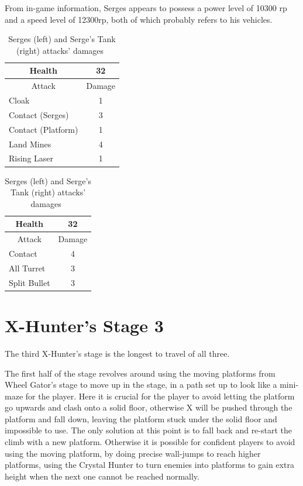 From in-game information, Serges appears to possess a power level of 10300 rp and a speed level of 12300rp, both of which probably refers to his vehicles.

\begin{table}[htp]
	\centering
	\begin{minipage}{.45\linewidth}
		\centering
		\begin{tabular}[h]{l c }
			\toprule
			\multicolumn{1}{c}{Health}  & 32 \\
			\midrule
			\multicolumn{1}{c}{Attack} & \multicolumn{1}{c}{Damage}\\
			Cloak & 1 \\
			Contact (Serges)& 3\\
			Contact (Platform)& 1\\
			Land Mines & 4\\
			Rising Laser& 1\\
			\bottomrule
		\end{tabular}
	\end{minipage}
	\begin{minipage}{.45\linewidth}
		\centering
		\begin{tabular}[h]{l c }
			\toprule
			\multicolumn{1}{c}{Health}  & 32 \\
			\midrule
			\multicolumn{1}{c}{Attack} & \multicolumn{1}{c}{Damage}\\
			Contact & 4 \\
			All Turret & 3\\
			Split Bullet & 3\\
			\bottomrule
		\end{tabular}
	\end{minipage}
	\caption{Serges (left) and Serge's Tank (right) attacks' damages~\cite{wiki:Serges}}
\end{table}


\section{X-Hunter's Stage 3}
The third X-Hunter's stage is the longest to travel of all three.

The first half of the stage revolves around using the moving platforms from Wheel Gator's stage to move up in the stage, in a path set up to look like a mini-maze for the player. Here it is crucial for the player to avoid letting the platform go upwards and clash onto a solid floor, otherwise X will be pushed through the platform and fall down, leaving the platform stuck under the solid floor and impossible to use. The only solution at this point is to fall back and re-start the climb with a new platform. Otherwise it is possible for confident players to avoid using the moving platform, by doing precise wall-jumps to reach higher platforms, using the Crystal Hunter to turn enemies into platforms to gain extra height when the next one cannot be reached normally.

